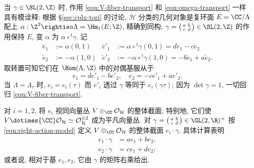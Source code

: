 当 $\gamma \in \SL(2, \Z)$ 时, 作用 \eqref{eqn:V-fiber-transport} 和 \eqref{eqn:omega-transport} 一样具有模诠释: 根据 \S\ref{sec:cplx-tori} 的讨论, $\mathcal{H}$ 分类的几何对象是复环面 $E = \CC/\Lambda$ 配上 $\alpha: \Z^2 \rightiso \Lambda = \Hm_1(E; \Z)$, 精确到同构; $\gamma = \twomatrix{a}{b}{c}{d} \in \SL(2, \Z)$ 的作用保持 $E$, 变 $\alpha$ 为 $\alpha \circ {}^t \gamma$. 记
\begin{align*}
	\check{e}_1 & := \alpha(0, 1) & \check{e}'_1 & := \alpha \circ {}^t \gamma (0, 1) =  d\check{e}_1 - c\check{e}_2 \\
	\check{e}_2 & := -\alpha(1, 0) & \check{e}'_2 & := - \alpha \circ {}^t \gamma (1, 0) = -b\check{e}_1 + a\check{e}_2 .
\end{align*}
取转置可知它们在 $\Hom(\Lambda, \Z)$ 中的对偶基服从于
\[ e_1 = d e'_1 - b e'_2, \quad e_2 = -c e'_1 + a e'_2. \]
当 $\Lambda = \Lambda_\tau$ 时, $e_i = e_i(\tau)$ 而 $e'_i$ 透过 $\gamma$ 等同于 $e_i(\gamma\tau)$; 因为 $\det\gamma = 1$, 一切回归 \eqref{eqn:V-fiber-transport}.

对 $i = 1, 2$, 将 $e_i$ 视同向量丛 $V \otimes_{\CC} \mathcal{O}_{\mathcal{H}}$ 的整体截面; 特别地, 它们使 $V \dotimes{\CC} \mathcal{O}_{\mathcal{H}} \simeq \mathcal{O}_{\mathcal{H}}^{\oplus 2}$ 成为平凡向量丛. 对 $\gamma = \twomatrix{a}{b}{c}{d} \in \GL(2, \R)^+$ 按 \eqref{eqn:right-action-model} 定义 $V \otimes_{\CC} \mathcal{O}_{\mathcal{H}}$ 的整体截面 $e_i \cdot \gamma$, 具体计算表明
\begin{equation}\label{eqn:e1e2-action}\begin{aligned}
	e_1 \cdot \gamma & = ae_1 + be_2, \\
	e_2 \cdot \gamma & = ce_1 + de_2;
\end{aligned}\end{equation}
或者说, 相对于基 $e_1, e_2$, 它由 $\gamma$ 的矩阵右乘给出.


